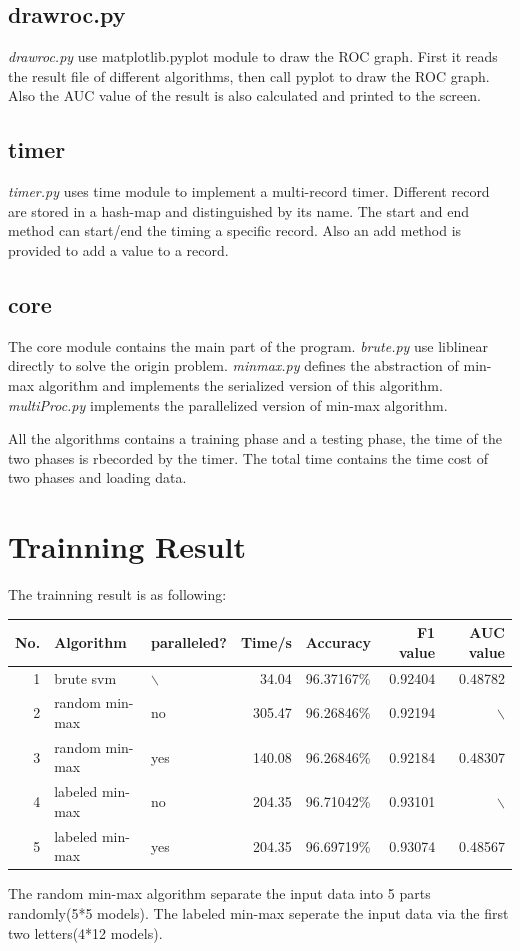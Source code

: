 \documentclass[11pt]{article}
\begin{document}
\subsection{drawroc.py}
\label{sec-3-5}
\emph{drawroc.py} use matplotlib.pyplot module to draw the ROC graph.
First it reads the result file of different algorithms, then call pyplot
to draw the ROC graph. Also the AUC value of the result is also calculated
and printed to the screen.
\subsection{timer}
\label{sec-3-6}
\emph{timer.py} uses time module to implement a multi-record timer. Different record
are stored in a hash-map and distinguished by its name. The start and end method
can start/end the timing a specific record. Also an add method is provided to
add a value to a record.
\subsection{core}
\label{sec-3-7}
The core module contains the main part of the program.
\emph{brute.py} use liblinear directly to solve the origin problem.
\emph{minmax.py} defines the abstraction of min-max algorithm and implements
the serialized version of this algorithm.
\emph{multiProc.py} implements the parallelized version of min-max algorithm.

All the algorithms contains a training phase and a testing phase, the time of
the two phases is rbecorded by the timer. The total time contains the time
cost of two phases and loading data.
\section{Trainning Result}
\label{sec-4}
The trainning result is as following:
\begin{center}
\begin{tabular}{rllrlrr}
\hline
No. & Algorithm & paralleled? & Time/s & Accuracy & F1 value & AUC value\\
\hline
1 & brute svm & $\backslash$ & 34.04 & 96.37167\% & 0.92404 & 0.48782\\
2 & random min-max & no & 305.47 & 96.26846\% & 0.92194 & $\backslash$\\
3 & random min-max & yes & 140.08 & 96.26846\% & 0.92184 & 0.48307\\
4 & labeled min-max & no & 204.35 & 96.71042\% & 0.93101 & $\backslash$\\
5 & labeled min-max & yes & 204.35 & 96.69719\% & 0.93074 & 0.48567\\
\hline
\end{tabular}
\end{center}
The random min-max algorithm separate the input data into 5 parts randomly(5*5 models).
The labeled min-max seperate the input data via the first two letters(4*12 models).
\end{document}
